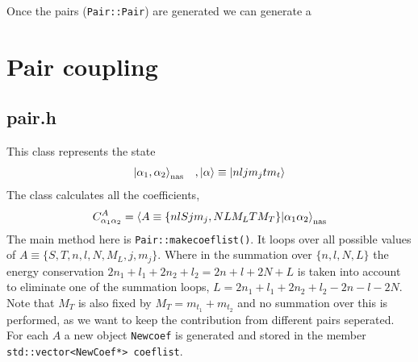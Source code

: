 \documentclass[10pt]{article}
\begin{document}
Once the pairs (\texttt{Pair::Pair}) are generated we can generate a 



\section{Pair coupling}
\subsection{pair.h}
This class represents the state
\begin{align}
	\ket{ \alpha_1, \alpha_2}_{\textrm{nas}} \;\;\;, \ket{\alpha} \equiv \ket{n l j m_j t m_t}
\end{align}
The class calculates all the coefficients,
\begin{align}
	C_{\alpha_1 \alpha_2}^{A} = \braket{A \equiv \{ n l S j m_j, N L M_L T M_T\} | \alpha_1 \alpha_2}_{\text{nas}}
	\label{eq:coef}
\end{align}
The main method here is \texttt{Pair::makecoeflist()}. It loops over all possible values of $ A \equiv \{ S,T,n,l,N,M_L,j,m_j \}$. Where in the summation over $\{n,l,N,L\}$ the energy conservation $2n_1 + l_1 + 2n_2 + l_2 = 2n + l + 2N + L$ is taken into account to eliminate one of the summation loops, $L = 2n_1 + l_1 + 2n_2 + l_2 - 2n - l - 2N$. Note that $M_T$ is also fixed by $M_T = m_{t_1} + m_{t_2}$ and no summation over this is performed, as we want to keep the contribution from different pairs seperated.
For each $A$ a new object \texttt{Newcoef} is generated and stored in the member \texttt{std::vector<NewCoef*> coeflist}.
\end{document}
